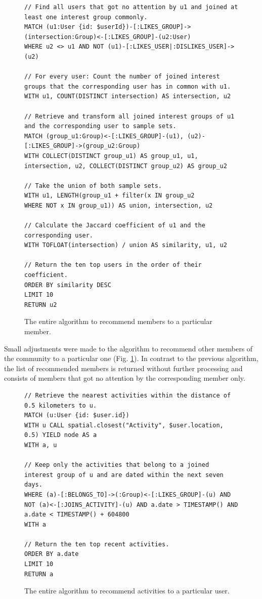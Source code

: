\documentclass[12pt,numbers=noenddot,parskip,bibliography=totocnumbered,listof=totocnumbered,draft]{scrreprt}
\begin{document}
\begin{figure}
\centering
\begin{lstlisting}
// Find all users that got no attention by u1 and joined at least one interest group commonly.
MATCH (u1:User {id: $userId})-[:LIKES_GROUP]->(intersection:Group)<-[:LIKES_GROUP]-(u2:User)
WHERE u2 <> u1 AND NOT (u1)-[:LIKES_USER|:DISLIKES_USER]->(u2)

// For every user: Count the number of joined interest groups that the corresponding user has in common with u1.
WITH u1, COUNT(DISTINCT intersection) AS intersection, u2

// Retrieve and transform all joined interest groups of u1 and the corresponding user to sample sets.
MATCH (group_u1:Group)<-[:LIKES_GROUP]-(u1), (u2)-[:LIKES_GROUP]->(group_u2:Group)
WITH COLLECT(DISTINCT group_u1) AS group_u1, u1, intersection, u2, COLLECT(DISTINCT group_u2) AS group_u2

// Take the union of both sample sets.
WITH u1, LENGTH(group_u1 + filter(x IN group_u2
WHERE NOT x IN group_u1)) AS union, intersection, u2

// Calculate the Jaccard coefficient of u1 and the corresponding user.
WITH TOFLOAT(intersection) / union AS similarity, u1, u2

// Return the ten top users in the order of their coefficient.
ORDER BY similarity DESC
LIMIT 10
RETURN u2
\end{lstlisting}
\caption[Algorithm to recommend members]{The entire algorithm to recommend members to a particular member.}
\label{recommendationalgorithmmembers}
\end{figure}

Small adjustments were made to the algorithm to recommend other members of the community to a particular one (Fig. \ref{recommendationalgorithmmembers}). In contrast to the previous algorithm, the list of recommended members is returned without further processing and consists of members that got no attention by the corresponding member only.

\begin{figure}
\centering
\begin{lstlisting}
// Retrieve the nearest activities within the distance of 0.5 kilometers to u.
MATCH (u:User {id: $user.id})
WITH u CALL spatial.closest("Activity", $user.location, 0.5) YIELD node AS a
WITH a, u

// Keep only the activities that belong to a joined interest group of u and are dated within the next seven days.
WHERE (a)-[:BELONGS_TO]->(:Group)<-[:LIKES_GROUP]-(u) AND NOT (a)<-[:JOINS_ACTIVITY]-(u) AND a.date > TIMESTAMP() AND a.date < TIMESTAMP() + 604800
WITH a

// Return the ten top recent activities.
ORDER BY a.date
LIMIT 10
RETURN a
\end{lstlisting}
\caption[Algorithm to recommend activities]{The entire algorithm to recommend activities to a particular user.}
\label{recommendationalogirthmactivities}
\end{figure}
\end{document}
